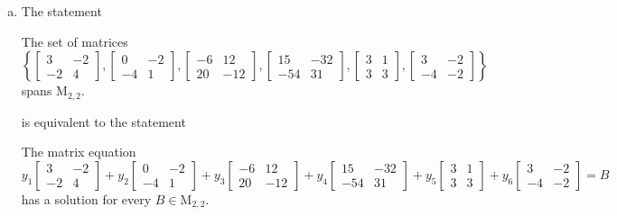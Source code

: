 \begin{exerciseAnswer}
\begin{enumerate}[(a)]
\item The statement 
\begin{center}\begin{minipage}{0.8\textwidth}
 The set of matrices \( \left\{ \left[\begin{array}{cc}
3 & -2 \\
-2 & 4
\end{array}\right] , \left[\begin{array}{cc}
0 & -2 \\
-4 & 1
\end{array}\right] , \left[\begin{array}{cc}
-6 & 12 \\
20 & -12
\end{array}\right] , \left[\begin{array}{cc}
15 & -32 \\
-54 & 31
\end{array}\right] , \left[\begin{array}{cc}
3 & 1 \\
3 & 3
\end{array}\right] , \left[\begin{array}{cc}
3 & -2 \\
-4 & -2
\end{array}\right] \right\} \) spans \(\mathrm{M}_{2,2}\). 
\end{minipage}\end{center}
     is equivalent to the statement 
\begin{center}\begin{minipage}{0.8\textwidth}
 The matrix equation \[ y_{1} \left[\begin{array}{cc}
3 & -2 \\
-2 & 4
\end{array}\right] + y_{2} \left[\begin{array}{cc}
0 & -2 \\
-4 & 1
\end{array}\right] + y_{3} \left[\begin{array}{cc}
-6 & 12 \\
20 & -12
\end{array}\right] + y_{4} \left[\begin{array}{cc}
15 & -32 \\
-54 & 31
\end{array}\right] + y_{5} \left[\begin{array}{cc}
3 & 1 \\
3 & 3
\end{array}\right] + y_{6} \left[\begin{array}{cc}
3 & -2 \\
-4 & -2
\end{array}\right] =B\] has a solution for every \(B \in \mathrm{M}_{2,2}\). 
\end{minipage}\end{center}
    

\end{enumerate}
\end{exerciseAnswer}
